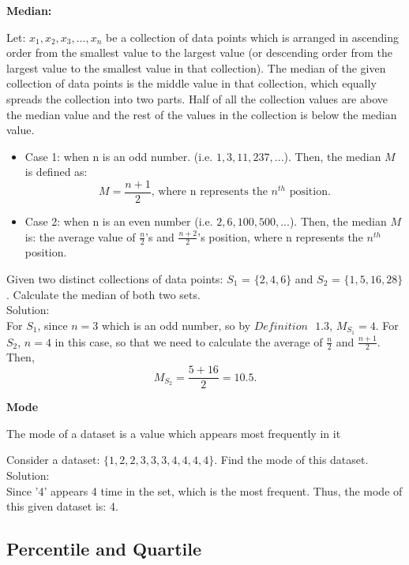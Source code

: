 \noindent
\textbf{Median:}
\begin{definition}
Let: $x_1, x_2, x_3, ... , x_n$ be a collection of data points which is arranged in ascending order from the smallest value to the largest value (or descending order from the largest value to the smallest value in that collection). The median of the given collection of data points is the middle value in that collection, which equally spreads the collection into two parts. Half of all the collection values are above the median value and the rest of the values in the collection is below the median value.
\begin{itemize}
 \item Case 1: when n is an odd number. (i.e. $1, 3, 11, 237,...$). Then, the median $M$ is defined as: \[ M = \frac{n+1}{2} \text{, where n represents the $n^{th}$ position}.\]
 \item Case 2: when n is an even number (i.e. $2, 6, 100, 500,...$). Then, the median $M$ is: the average value of $\frac{n}{2}$'s and $\frac{n+2}{2}$'s position, where n represents the $n^{th}$ position.
 \end{itemize}
\end{definition}
\begin{example}
Given two distinct collections of data points: $S_1$ = $\{2, 4, 6\}$ and $S_2$ = $\{1, 5, 16, 28\}$. Calculate the median of both two sets.\\
Solution: \\
For $S_1$, since $n = 3$ which is an odd number, so by $Definition \text{ } 1.3$, $M_{S_1} = 4$. For $S_2$, $n = 4$ in this case, so that we need to calculate the average of $\frac{n}{2}$ and $\frac{n+1}{2}$. Then, \[ M_{S_2} = \frac{5+16}{2} = 10.5.\]
\end{example}

\noindent
\textbf{Mode}
\begin{definition}
The mode of a dataset is a value which appears most frequently in it
\end{definition}

\begin{example}
Consider a dataset: $\{1, 2, 2, 3, 3, 3, 4, 4, 4, 4\}$. Find the mode of this dataset.\\
Solution:\\
Since '4' appears 4 time in the set, which is the most frequent. Thus, the mode of this given dataset is: 4.
\end{example}

\subsection{Percentile and Quartile}\\

